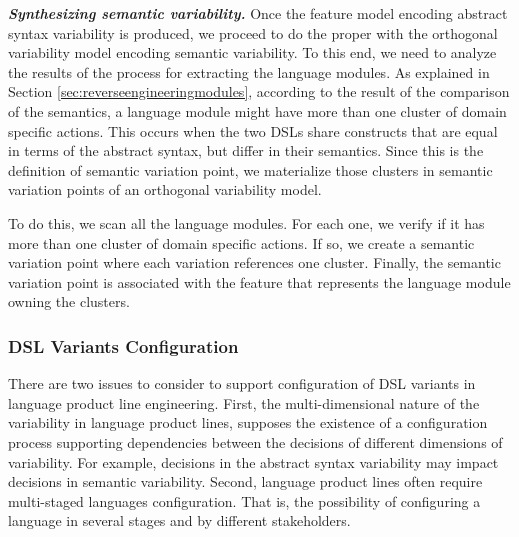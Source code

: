 
\vspace{2mm}
\textit{\textbf{Synthesizing semantic variability.}} Once the feature model encoding abstract syntax variability is produced, we proceed to do the proper with the orthogonal variability model encoding semantic variability. To this end, we need to analyze the results of the process for extracting the language modules. As explained in Section \ref{sec:reverseengineeringmodules}, according to the result of the comparison of the semantics, a language module might have more than one cluster of domain specific actions. This occurs when the two DSLs share constructs that are equal in terms of the abstract syntax, but differ in their semantics. Since this is the definition of semantic variation point, we materialize those clusters in semantic variation points of an orthogonal variability model.

To do this, we scan all the language modules. For each one, we verify if it has more than one cluster of domain specific actions. If so, we create a semantic variation point where each variation references one cluster. Finally, the semantic variation point is associated with the feature that represents the language module owning the clusters. 

\subsubsection{DSL Variants Configuration}

There are two issues to consider to support configuration of DSL variants in language product line engineering. First, the multi-dimensional nature of the variability in language product lines, supposes the existence of a configuration process supporting dependencies between the decisions of different dimensions of variability. For example, decisions in the abstract syntax variability may impact decisions in semantic variability. Second, language product lines often require multi-staged languages configuration. That is, the possibility of configuring a language in several stages and by different stakeholders.

